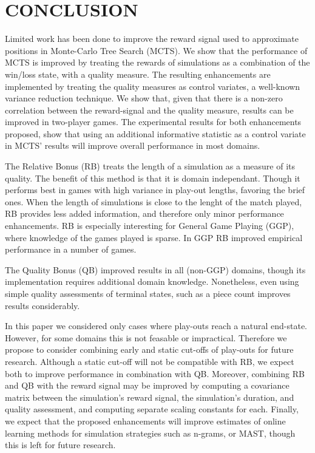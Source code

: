 \documentclass{ecai2014}
\begin{document}
\section{CONCLUSION}
\label{sec:concl}
Limited work has been done to improve the reward signal used to approximate positions in Monte-Carlo Tree Search (MCTS). We show that the performance of MCTS is improved by treating the rewards of simulations as a combination of the win/loss state, with a quality measure. The resulting enhancements are implemented by treating the quality measures as control variates, a well-known variance reduction technique. We show that, given that there is a non-zero correlation between the reward-signal and the quality measure, results can be improved in two-player games. The experimental results for both enhancements proposed, show that using an additional informative statistic as a control variate in MCTS' results will improve overall performance in most domains.

The Relative Bonus (RB) treats the length of a simulation as a measure of its quality. The benefit of this method is that it is domain independant. Though it performs best in games with high variance in play-out lengths, favoring the brief ones. When the length of simulations is close to the lenght of the match played, RB provides less added information, and therefore only minor performance enhancements. RB is especially interesting for General Game Playing (GGP), where knowledge of the games played is sparse. In GGP RB improved empirical performance in a number of games.

The Quality Bonus (QB) improved results in all (non-GGP) domains, though its implementation requires additional domain knowledge. Nonetheless, even using simple quality assessments of terminal states, such as a piece count improves results considerably.

In this paper we considered only cases where play-outs reach a natural end-state. However, for some domains this is not feasable or impractical. Therefore we propose to consider combining early and static cut-offs of play-outs for future research. Although a static cut-off will not be compatible with RB, we expect both to improve performance in combination with QB. Moreover, combining RB and QB with the reward signal may be improved by computing a covariance matrix between the simulation's reward signal, the simulation's duration, and quality assessment, and computing separate scaling constants for each. Finally, we expect that the proposed enhancements will improve estimates of online learning methods for simulation strategies such as n-grams, or MAST, though this is left for future research.



\end{document}

